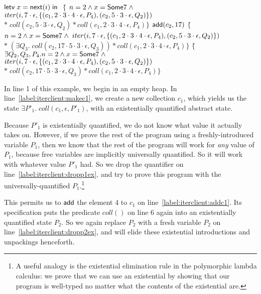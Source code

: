 \begin{specification}
 $\mathsf{letv}\;x = \mathsf{next}(i)\;\mathsf{in}\;$  \nextline
 $\{$\= $n = 2 \land x = \mathsf{Some }7 \;\land $ 
 \> $iter(i, 7\cdot\epsilon, \{{(c_1, 2\cdot3\cdot4\cdot\epsilon, P_4), (c_2, 5\cdot3\cdot\epsilon, Q_2)}\})$  \nextline
 \> $*\; coll(c_2, 5\cdot3\cdot\epsilon, Q_2) * coll(c_1, 2\cdot3\cdot4\cdot\epsilon, P_4)\}$  
 $\mathsf{add}(c_2, 17)$  \nextline
 $\{$\= $n = 2 \land x = \mathsf{Some }7 \;\land $ \nextline
 \> $iter(i, 7\cdot\epsilon, \{{(c_1, 2\cdot3\cdot4\cdot\epsilon, P_4), (c_2, 5\cdot3\cdot\epsilon, Q_2)}\})$  
 \> $* \; (\exists Q_3.\; coll(c_2, 17\cdot5\cdot3\cdot\epsilon, Q_3)) * coll(c_1, 2\cdot3\cdot4\cdot\epsilon, P_4)\}$  \nextline
 $\{$\= $\exists Q_2, Q_3, P_4. n = 2 \land x = \mathsf{Some }7 \;\land $ \nextline
 \> $iter(i, 7\cdot\epsilon, \{{(c_1, 2\cdot3\cdot4\cdot\epsilon, P_4), (c_2, 5\cdot3\cdot\epsilon, Q_2)}\})$  \nextline 
 \> $* \; coll(c_2, 17\cdot5\cdot3\cdot\epsilon, Q_3) * coll(c_1, 2\cdot3\cdot4\cdot\epsilon, P_4)\}$  
\end{specification}


In line 1 of this example, we begin in an empty heap. In
line~\ref{label:iterclient:makec1}, we create a new collection $c_1$,
which yields us the state $\exists P'_1.\; coll(c_1, \epsilon, P'_1)$,
with an existentially quantified abstract state.

Because $P'_1$ is existentially quantified, we do not know what value
it actually takes on. However, if we prove the rest of the program
using a freshly-introduced variable $P_1$, then we know that the rest
of the program will work for \emph{any} value of $P_1$, because free
variables are implicitly universally quantified.  So it will work with
whatever value $P'_1$ had. So we drop the quantifier on line~\ref{label:iterclient:dropp1ex}, and
try to prove this program with the universally-quantified
$P_1$.\footnote{A useful analogy is the existential elimination rule
  in the polymorphic lambda calculus: we prove that we can use an
  existential by showing that our program is well-typed no matter what
  the contents of the existential are.}

This permits us to $\mathsf{add}$ the element 4 to $c_1$ on
line~\ref{label:iterclient:addc1}. Its specification puts the
predicate $coll()$ on line 6 again into an existentially quantified
state $P_2$. So we again replace $P_2$ with a fresh variable $P_2$ on
line~\ref{label:iterclient:dropp2ex}, and will elide these existential introductions and unpackings
henceforth.


